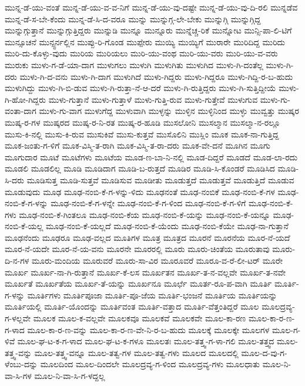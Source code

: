 {ಮುನ್ನ-ಡೆ-ಯು-ವಂತೆ
ಮುನ್ನ-ಡೆ-ಯು-ವ-ವ-ನಿಗೆ
ಮುನ್ನ-ಡೆ-ಯು-ವು-ದಷ್ಟೇ
ಮುನ್ನ-ಡೆ-ಯು-ವು-ದಿ-ರಲಿ
ಮುನ್ನಡೆವ
ಮುನ್ನ-ಡೆ-ಸ-ಬೇ-ಕೆಂದು
ಮುನ್ನ-ಡೆ-ಸಿ-ದ-ವರೂ
ಮುನ್ನು
ಮುನ್ನುಗ್ಗ-ಲೇ-ಬೇಕು
ಮುನ್ನುಗ್ಗಿ
ಮುನ್ನುಗ್ಗಿದ್ದ
ಮುನ್ನುಗ್ಗುತ್ತಾನೆ
ಮುನ್ನುಗ್ಗುತ್ತಿದ್ದರು
ಮುನ್ನುಡಿ
ಮುನ್ನೂ
ಮುನ್ನೂರು
ಮುನ್ನೆಚ್ಚ-ರಿಕೆ
ಮುನ್ನೋಟ
ಮುನ್ಸಿ-ಪಾ-ಲಿ-ಟಿಗೆ
ಮುನ್ಸೂಚನೆ
ಮುನ್ಸ್ಟರ್ನಲ್ಲಿನ
ಮುಪ್ಪು-ರಿ-ಗೊಂಡ
ಮುಪ್ಪೇರು
ಮುಯ್ಯಿ
ಮುಯ್ಯಿಗೆ
ಮುರಾರೇ
ಮುರಿದಿದ್ದ
ಮುರಿದು
ಮುರಿ-ದು-ಕೊಳ್ಳು-ವುದು
ಮುರಿಯ
ಮುರಿಯಲು
ಮುರಿ-ಯು-ವಂಥ
ಮುರಿ-ಯು-ವರು
ಮುರಿ-ಯು-ವ-ವರು
ಮುರುಕು
ಮುಳು-ಗ-ಡೆ-ಯಾ-ದಾಗ
ಮುಳುಗಲು
ಮುಳುಗಿ
ಮುಳುಗಿತು
ಮುಳುಗಿದ
ಮುಳು-ಗಿ-ದಂತೆಲ್ಲ
ಮುಳು-ಗಿ-ದರು
ಮುಳು-ಗಿ-ದ-ವನು
ಮುಳು-ಗಿ-ದಾಗ
ಮುಳುಗಿದೆ
ಮುಳು-ಗಿದ್ದರು
ಮುಳು-ಗಿದ್ದರೂ
ಮುಳು-ಗಿದ್ದಿ-ರ-ಬ-ಹುದು
ಮುಳುಗಿದ್ದು
ಮುಳು-ಗಿ-ಬಿ-ಡುವ
ಮುಳು-ಗಿ-ರುತ್ತಾ-ನೆ-ಆ-ದರೆ
ಮುಳು-ಗಿ-ರುತ್ತಿದ್ದರು
ಮುಳು-ಗಿ-ಸುತ್ತಿದ್ದೀಯೆ
ಮುಳು-ಗಿ-ಹೋ-ಗಿದ್ದರು
ಮುಳು-ಗುತ್ತಾನೆ
ಮುಳು-ಗುತ್ತಾಳೆ
ಮುಳು-ಗುತ್ತಿ-ರುವ
ಮುಳು-ಗುತ್ತೇವೆ
ಮುಳುಗುವ
ಮುಳು-ಗು-ವಂತಾ-ದಾಗ
ಮುಳು-ಗು-ವಾಗ
ಮುಳುಗೆದ್ದ
ಮುಳುವಾಗಿ
ಮುಳ್ಳನ್ನು
ಮುಳ್ಳಿನ
ಮುಳ್ಳಿನಿಂದ
ಮುಳ್ಳು
ಮುವ್ವತ್ತು
ಮುಷ್ಕರ
ಮುಷ್ಕ-ರ-ಗಳ
ಮುಷ್ಕರದ
ಮುಷ್ಕ-ರ-ನಿ-ರತ
ಮುಷ್ಕ-ರ-ಹೂಡಿ
ಮುಸಲೋನಿ
ಮುಸಲ್ಮಾನ
ಮುಸಲ್ಮಾ-ನ-ರಲ್ಲೂ
ಮುಸು-ಕಿ-ನಲ್ಲಿ
ಮುಸು-ಕಿ-ರುವ
ಮುಸುಕಿವೆ
ಮುಸು-ಕುತ್ತವೆ
ಮುಸೊಲಿನಿ
ಮುಸ್ಲಿಂ
ಮೂಕ
ಮೂಕ-ನಾ-ಗುತ್ತಿದ್ದ
ಮೂಕ-ಜಂತು-ಗ-ಳಿಗೆ
ಮೂಕ-ವಿಸ್ಮಿ-ತ-ರಾಗಿ
ಮೂಕ-ವಿಸ್ಮಿ-ತ-ರಾ-ದರು
ಮೂಕ-ವೇ-ದನೆ
ಮೂಗಿನ
ಮೂಗು
ಮೂಗುದಾರ
ಮೂಟೆ
ಮೂಟೆಗಳು
ಮೂಟೆಯ
ಮೂಡ-ಣ-ಬಾ-ನಿ-ನಲ್ಲಿ
ಮೂಡ-ದಿದ್ದರೆ
ಮೂಡದೆ
ಮೂಡ-ಲಾ-ರದು
ಮೂಡಲಿ
ಮೂಡಲಿಲ್ಲ
ಮೂಡಿ
ಮೂಡಿದಾಗ
ಮೂಡಿ-ಬ-ರುತ್ತದೆ
ಮೂಡಿರ
ಮೂಡಿ-ಸಿ-ಕೊಂಡರೆ
ಮೂಡಿಸಿದ
ಮೂಡಿ-ಸಿ-ದರು
ಮೂಡಿಸುತ್ತ
ಮೂಡಿ-ಸುತ್ತವೆ
ಮೂಡಿಸುವ
ಮೂಡೀತು
ಮೂಡುತ್ತದೆ
ಮೂಡುತ್ತವೆ
ಮೂಡುತ್ತಿದೆ
ಮೂಡುವ
ಮೂಡುವುದು
ಮೂಢ
ಮೂಢ-ನಂಬಿ-ಕೆ-ಗ-ಳನ್ನು-ಳಿದು
ಮೂಢನಂತೆ
ಮೂಢ-ನಂಬಿಕೆ
ಮೂಢ-ನಂಬಿ-ಕೆ-ಗಳ
ಮೂಢ-ನಂಬಿ-ಕೆ-ಗ-ಳನ್ನು
ಮೂಢ-ನಂಬಿ-ಕೆ-ಗ-ಳನ್ನೇ
ಮೂಢ-ನಂಬಿ-ಕೆ-ಗ-ಳಿಂದ
ಮೂಢ-ನಂಬಿ-ಕೆ-ಗ-ಳಿಗೆ
ಮೂಢ-ನಂಬಿ-ಕೆ-ಗಳು
ಮೂಢ-ನಂಬಿ-ಕೆ-ಗಿಂತಲೂ
ಮೂಢ-ನಂಬಿ-ಕೆಯ
ಮೂಢ-ನಂಬಿ-ಕೆ-ಯನ್ನು
ಮೂಢ-ನಂಬಿ-ಕೆ-ಯನ್ನೂ
ಮೂಢ-ನಂಬಿ-ಕೆ-ಯಲ್ಲ
ಮೂಢ-ನಂಬಿ-ಕೆ-ಯಲ್ಲದೆ
ಮೂಢ-ನಂಬಿ-ಕೆ-ಯೆಂದು
ಮೂಢ-ನಂಬಿ-ಕೆಯೇ
ಮೂಢ-ನಾ-ಗುತ್ತಾನೆ
ಮೂಢನೆಂದು
ಮೂಢರೂ
ಮೂಢ-ವಲ್ಲದ
ಮೂತಿಗಳ
ಮೂತ್ರ
ಮೂತ್ರದ
ಮೂರನೆ
ಮೂರನೆಯ
ಮೂರ-ನೆ-ಯದೆ
ಮೂರ-ನೆ-ಯದೇ
ಮೂರ-ನೆ-ಯ-ವನು
ಮೂರನೇ
ಮೂರರಲ್ಲಿ
ಮೂರು
ಮೂರು-ಚಿಂತೆಯ
ಮೂರುತಾವು
ಮೂರು-ದಿ-ನ-ಗಳ
ಮೂರು-ಮಂದಿಯ
ಮೂರುವರೆ
ಮೂರು-ಸಾ-ವಿರ
ಮೂರೂವರೆ
ಮೂರೂ-ವ-ರೆ-ಲೀ-ಟರ್
ಮೂರೇ
ಮೂರ್ಖ
ಮೂರ್ಖ-ನಾ-ಗಿ-ರುತ್ತಾನೆ
ಮೂರ್ಖ-ಕೆ-ಲಸ
ಮೂರ್ಖತನ
ಮೂರ್ಖ-ತ-ನ-ವಲ್ಲವೇ
ಮೂರ್ಖ-ತ-ನವೇ
ಮೂರ್ಖತೆ
ಮೂರ್ಖತೆಯ
ಮೂರ್ಖ-ತೆ-ಯನ್ನು
ಮೂರ್ಖನೂ
ಮೂರ್ಛೆ
ಮೂರ್ತ-ರೂ-ಪ-ವಾಗಿ
ಮೂರ್ತಿ
ಮೂರ್ತಿ-ಗ-ಳನ್ನು
ಮೂರ್ತಿಗಳು
ಮೂರ್ತಿಪೂಜಾ
ಮೂರ್ತಿ-ಪೂ-ಜೆಯ
ಮೂರ್ತಿ-ಭಂಜನೆ
ಮೂರ್ತಿಯ
ಮೂರ್ತಿಯನ್ನು
ಮೂರ್ತಿಯಲ್ಲಿ
ಮೂರ್ತಿ-ಯೊಂದನ್ನು
ಮೂರ್ತಿವಂತ
ಮೂರ್ತಿ-ವತ್ತಾದ
ಮೂರ್ತಿ-ವೆತ್ತಂತಿದ್ದರೆ
ಮೂಲ
ಮೂಲದ್ರವ್ಯ-ಗ-ಳಲ್ಲವೇ
ಮೂಲಕ
ಮೂಲ-ಕ-ವಲ್ಲವೇ
ಮೂಲಕವೂ
ಮೂಲಕವೆ
ಮೂಲಕವೇ
ಮೂಲ-ಕಾ-ರಣ
ಮೂಲ-ಕಾ-ರ-ಣ-ಗ-ಳಾದ
ಮೂಲ-ಕಾ-ರ-ಣ-ವನ್ನು
ಮೂಲ-ಕಾ-ರ-ಣ-ವೇ-ನಿ-ರ-ಬ-ಹುದು
ಮೂಲಕ್ಕೆ
ಮೂಲಕ್ಕೇ
ಮೂಲಗಳ
ಮೂಲ-ಗ-ಳಿವೆ
ಮೂಲ-ಘ-ಟ-ಕ-ಗ-ಳಾದ
ಮೂಲ-ಘ-ಟ-ಕ-ಗಳೂ
ಮೂಲತಃ
ಮೂಲ-ತತ್ತ್ವ-ಗ-ಳಾ-ಗಲಿ
ಮೂಲ-ತತ್ತ್ವದ
ಮೂಲ-ತತ್ತ್ವ-ವನ್ನು
ಮೂಲ-ತತ್ತ್ವ-ವನ್ನೂ
ಮೂಲ-ತತ್ವ-ಗಳ
ಮೂಲ-ತತ್ವ-ಗಳು
ಮೂಲದ
ಮೂಲದಲ್ಲಿ
ಮೂಲ-ದ-ವು-ಗ-ಳೆಂಬು-ದನ್ನು
ಮೂಲದಿಂದ
ಮೂಲ-ದಿಂದಲೇ
ಮೂಲದ್ರವ್ಯ-ಗ-ಳಿಂದ
ಮೂಲದ್ರವ್ಯ-ಗಳು
ಮೂಲಧಾತು
ಮೂಲ-ನಿ-ವಾ-ಸಿ-ಗಳ
ಮೂಲ-ನಿ-ವಾ-ಸಿ-ಗ-ಳದ್ದಲ್ಲ
}
